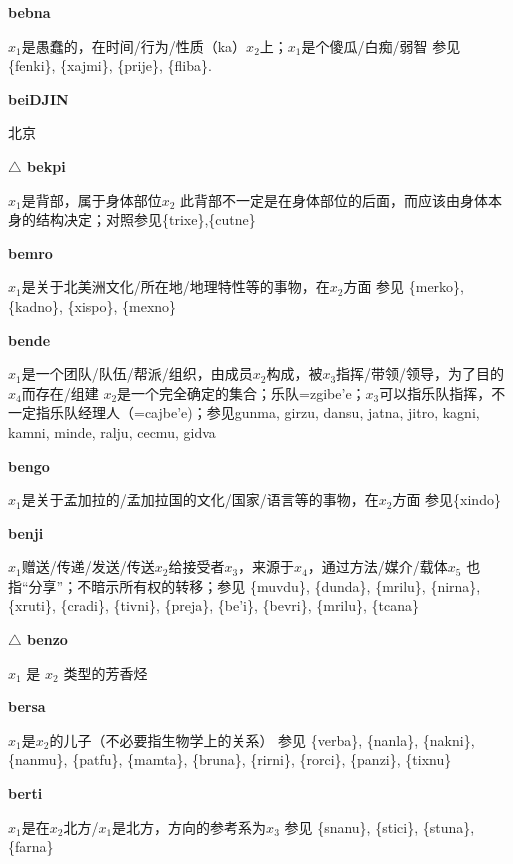 \documentclass[notitlepage,twocolumn,a4paper,10pt]{book}
\begin{document}
{\sffamily\bfseries bebna}\enspace {\ttfamily\bfseries[beb]}  $x_1$是愚蠢的，在时间\slash{}行为\slash{}性质（ka）$x_2$上；$x_1$是个傻瓜\slash{}白痴\slash{}弱智 \textemdash{} 参见 \{fenki\}, \{xajmi\}, \{prije\}, \{fliba\}.

{\sffamily\bfseries beiDJIN} 北京

{\sffamily\bfseries $\triangle$ bekpi} $x_1$是背部，属于身体部位$x_2$ \textemdash{} 此背部不一定是在身体部位的后面，而应该由身体本身的结构决定；对照参见\{trixe\},\{cutne\}

{\sffamily\bfseries bemro}\enspace {\ttfamily\bfseries[bem     be'o]}  $x_1$是关于北美洲文化\slash{}所在地\slash{}地理特性等的事物，在$x_2$方面 \textemdash{} 参见 \{merko\}, \{kadno\}, \{xispo\}, \{mexno\}

{\sffamily\bfseries bende}\enspace {\ttfamily\bfseries[bed     be'e]}  $x_1$是一个团队\slash{}队伍\slash{}帮派\slash{}组织，由成员$x_2$构成，被$x_3$指挥\slash{}带领\slash{}领导，为了目的$x_4$而存在\slash{}组建 \textemdash{} $x_2$是一个完全确定的集合；乐队={zgibe'e}；$x_3$可以指乐队指挥，不一定指乐队经理人（={cajbe'e})；参见{gunma}, {girzu}, {dansu}, {jatna}, {jitro}, {kagni}, {kamni}, {minde}, {ralju}, {cecmu}, {gidva}

{\sffamily\bfseries bengo}\enspace {\ttfamily\bfseries[beg]}  $x_1$是关于孟加拉的\slash{}孟加拉国的文化\slash{}国家\slash{}语言等的事物，在$x_2$方面 \textemdash{} 参见\{xindo\}

{\sffamily\bfseries benji}\enspace {\ttfamily\bfseries[bej     be'i]}  $x_1$赠送\slash{}传递\slash{}发送\slash{}传送$x_2$给接受者$x_3$，来源于$x_4$，通过方法\slash{}媒介\slash{}载体$x_5$ \textemdash{} 也指“分享”；不暗示所有权的转移；参见 \{muvdu\}, \{dunda\}, \{mrilu\}, \{nirna\}, \{xruti\}, \{cradi\}, \{tivni\}, \{preja\}, \{be'i\}, \{bevri\}, \{mrilu\}, \{tcana\}

{\sffamily\bfseries $\triangle$ benzo} $x_1$ 是 $x_2$ 类型的芳香烃

{\sffamily\bfseries bersa}\enspace {\ttfamily\bfseries[bes     be'a]}  $x_1$是$x_2$的儿子（不必要指生物学上的关系） \textemdash{} 参见 \{verba\}, \{nanla\}, \{nakni\}, \{nanmu\}, \{patfu\}, \{mamta\}, \{bruna\}, \{rirni\}, \{rorci\}, \{panzi\}, \{tixnu\}

{\sffamily\bfseries berti}\enspace {\ttfamily\bfseries[ber]}  $x_1$是在$x_2$北方\slash{}$x_1$是北方，方向的参考系为$x_3$ \textemdash{} 参见 \{snanu\}, \{stici\}, \{stuna\}, \{farna\}
\end{document}
